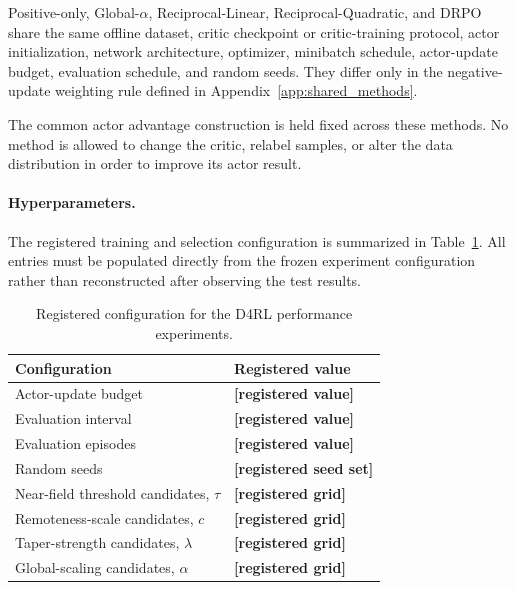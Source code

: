 \documentclass[sigconf,anonymous,review]{acmart}
\theoremstyle{acmdefinition}
\begin{document}
Positive-only, Global-\(\alpha\), Reciprocal-Linear,
Reciprocal-Quadratic, and DRPO share the same offline dataset, critic
checkpoint or critic-training protocol, actor initialization, network
architecture, optimizer, minibatch schedule, actor-update budget,
evaluation schedule, and random seeds. They differ only in the
negative-update weighting rule defined in
Appendix~\ref{app:shared_methods}.

The common actor advantage construction is held fixed across these
methods. No method is allowed to change the critic, relabel samples, or
alter the data distribution in order to improve its actor result.

\paragraph{Hyperparameters.}

The registered training and selection configuration is summarized in
Table~\ref{tab:d4rl_registered_config}. All entries must be populated
directly from the frozen experiment configuration rather than
reconstructed after observing the test results.

\begin{table}[t]
\centering
\caption{Registered configuration for the D4RL performance experiments.}
\label{tab:d4rl_registered_config}

\small
\setlength{\tabcolsep}{8pt}
\renewcommand{\arraystretch}{1.12}

\begin{tabular}{@{}ll@{}}
\toprule
Configuration & Registered value \\
\midrule
Actor-update budget
& \textbf{[registered value]} \\
Evaluation interval
& \textbf{[registered value]} \\
Evaluation episodes
& \textbf{[registered value]} \\
Random seeds
& \textbf{[registered seed set]} \\
Near-field threshold candidates, $\tau$
& \textbf{[registered grid]} \\
Remoteness-scale candidates, $c$
& \textbf{[registered grid]} \\
Taper-strength candidates, $\lambda$
& \textbf{[registered grid]} \\
Global-scaling candidates, $\alpha$
& \textbf{[registered grid]} \\
\bottomrule
\end{tabular}
\end{table}
\end{document}
